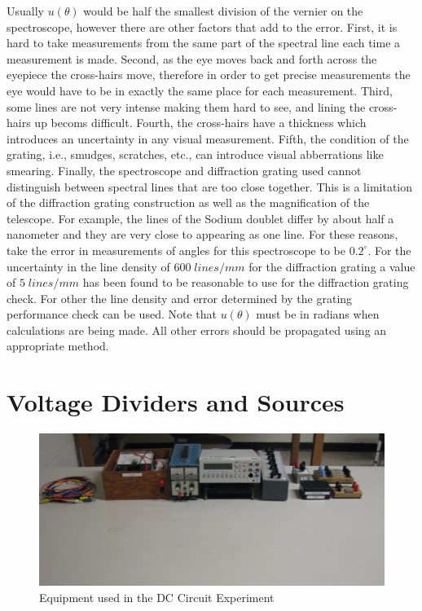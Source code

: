 Usually $u(\theta)$ would be half the smallest division of the vernier on the spectroscope, however there are other factors that add to the error. First, it is hard to take measurements from the same part of the spectral line each time a measurement is made. Second, as the eye moves back and forth across the eyepiece the cross-hairs move, therefore in order to get precise measurements the eye would have to be in exactly the same place for each measurement. Third, some lines are not very intense making them hard to see, and lining the cross-hairs up becoms difficult. Fourth, the cross-hairs have a thickness which introduces an uncertainty in any visual measurement. Fifth, the condition of the grating, i.e., smudges, scratches, etc., can introduce visual abberrations like smearing. Finally, the spectroscope and diffraction grating used cannot distinguish between spectral lines that are too close together. This is a limitation of the diffraction grating construction as well as the magnification of the telescope. For example, the lines of the Sodium doublet differ by about half a nanometer and they are very close to appearing as one line. For these reasons, take the error in measurements of angles for this spectroscope to be $0.2^{\circ}$. For the uncertainty in the line density of $600\;lines/mm$ for the diffraction grating a value of $5\;lines/mm$ has been found to be reasonable to use for the diffraction grating check. For other the line density and error determined by the grating performance check can be used. Note that $u(\theta)$ must be in radians when calculations are being made. All other errors should be propagated using an appropriate method.



\chapter{Voltage Dividers and Sources}


\begin{figure}[H]
    \centering
    \includegraphics[scale = 0.8]{Images/Divid1.PNG}
    \caption{Equipment used in the DC Circuit Experiment}
    \label{fig:DCSetup}
\end{figure}


